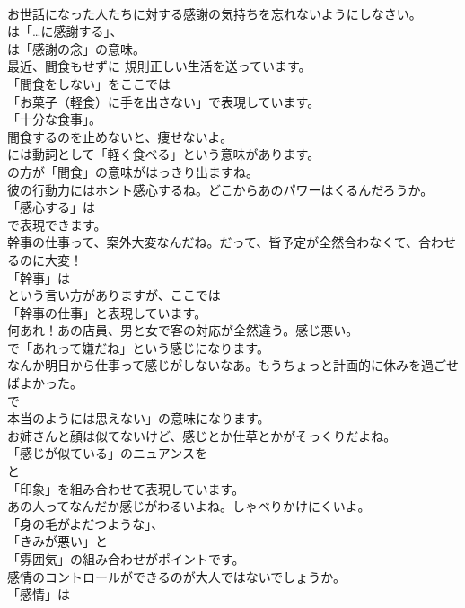 \documentclass[8pt]{extreport}
\begin{document}
\begin{CJK}{UTF8}{min}
\\	お世話になった人たちに対する感謝の気持ちを忘れないようにしなさい。 
\\	は「…に感謝する」、
\\	は「感謝の念」の意味。	
\\	最近、間食もせずに 規則正しい生活を送っています。 
\\	「間食をしない」をここでは
\\	「お菓子（軽食）に手を出さない」で表現しています。
\\	「十分な食事」。	
\\	間食するのを止めないと、痩せないよ。 
\\	には動詞として「軽く食べる」という意味があります。
\\	の方が「間食」の意味がはっきり出ますね。	
\\	彼の行動力にはホント感心するね。どこからあのパワーはくるんだろうか。 
\\	「感心する」は
\\	で表現できます。	
\\	幹事の仕事って、案外大変なんだね。だって、皆予定が全然合わなくて、合わせるのに大変！ 
\\	「幹事」は
\\	という言い方がありますが、ここでは
\\	「幹事の仕事」と表現しています。	
\\	何あれ！あの店員、男と女で客の対応が全然違う。感じ悪い。 
\\	で「あれって嫌だね」という感じになります。	
\\	なんか明日から仕事って感じがしないなあ。もうちょっと計画的に休みを過ごせばよかった。 
\\	で
\\	本当のようには思えない」の意味になります。	
\\	お姉さんと顔は似てないけど、感じとか仕草とかがそっくりだよね。 
\\	「感じが似ている」のニュアンスを
\\	と
\\	「印象」を組み合わせて表現しています。	
\\	あの人ってなんだか感じがわるいよね。しゃべりかけにくいよ。 
\\	「身の毛がよだつような」、
\\	「きみが悪い」と
\\	「雰囲気」の組み合わせがポイントです。	
\\	感情のコントロールができるのが大人ではないでしょうか。 
\\	「感情」は

\end{CJK}
\end{document}

